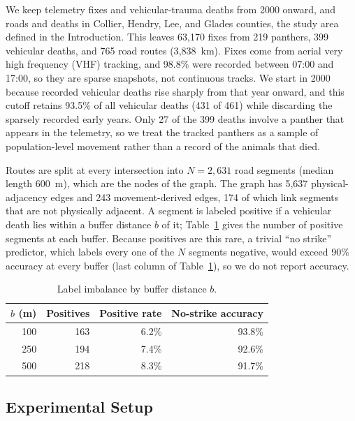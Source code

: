 \documentclass[letterpaper]{article}
\begin{document}
We keep telemetry fixes and vehicular-trauma deaths from 2000 onward, and roads and deaths in Collier, Hendry, Lee, and Glades counties, the study area defined in the Introduction. This leaves 63{,}170 fixes from 219 panthers, 399 vehicular deaths, and 765 road routes (3{,}838~km). Fixes come from aerial very high frequency (VHF) tracking, and 98.8\% were recorded between 07:00 and 17:00, so they are sparse snapshots, not continuous tracks. We start in 2000 because recorded vehicular deaths rise sharply from that year onward, and this cutoff retains 93.5\% of all vehicular deaths (431 of 461) while discarding the sparsely recorded early years. Only 27 of the 399 deaths involve a panther that appears in the telemetry, so we treat the tracked panthers as a sample of population-level movement rather than a record of the animals that died.

Routes are split at every intersection into $N=2{,}631$ road segments (median length 600~m), which are the nodes of the graph. The graph has 5{,}637 physical-adjacency edges and 243 movement-derived edges, 174 of which link segments that are not physically adjacent. A segment is labeled positive if a vehicular death lies within a buffer distance $b$ of it; Table~\ref{tab:labels} gives the number of positive segments at each buffer. Because positives are this rare, a trivial ``no strike'' predictor, which labels every one of the $N$ segments negative, would exceed 90\% accuracy at every buffer (last column of Table~\ref{tab:labels}), so we do not report accuracy.


\begin{table}[t]
\centering
\small
\begin{tabular}{rrrr}
\hline
\textbf{$b$ (m)} & \textbf{Positives} & \textbf{Positive rate} & \textbf{No-strike accuracy} \\
\hline
100 & 163 & 6.2\% & 93.8\% \\
250 & 194 & 7.4\% & 92.6\% \\
500 & 218 & 8.3\% & 91.7\% \\
\hline
\end{tabular}
\caption{Label imbalance by buffer distance $b$.}
\label{tab:labels}
\end{table}

\subsection{Experimental Setup}
\end{document}
